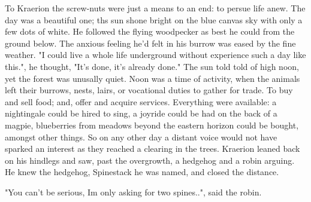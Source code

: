 \documentclass[smalldemyvopaper,11pt,twoside,onecolumn,openright,extrafontsizes]{memoir}
\begin{document}



To Kraerion the screw-nuts were just a means to an end: to persue life anew. The day was a beautiful one; ths sun shone bright on the blue canvas sky with only a few dots of white. He followed the flying woodpecker as best he could from the ground below. The anxious feeling he'd felt in his burrow was eased by the fine weather.
  "I could live a whole life underground without experience such a day like this.", he thought, "It's done, it's already done."
The sun told told of high noon, yet the forest was unusally quiet. Noon was a time of activity, when the animals left their burrows, nests, lairs, or vocational duties to gather for trade. To buy and sell food; and, offer and acquire services. Everything were available: a nightingale could be hired to sing, a joyride could be had on the back of a magpie, blueberries from meadows beyond the eastern horizon could be bought, amongst other things.
  So on any other day a distant voice would not have sparked an interest as they reached a clearing in the trees. Kraerion leaned back on his hindlegs and saw, past the overgrowth, a hedgehog and a robin arguing. He knew the hedgehog, Spinestack he was named, and closed the distance.


"You can't be serious, Im only asking for two spines..", said the robin.
\end{document}
